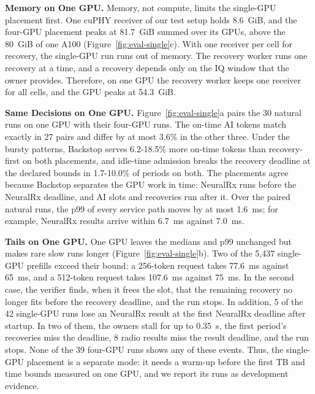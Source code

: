 \documentclass[acmsmall,screen,review,anonymous]{acmart}
\newcommand{\sys}{Backstop\xspace}
\newcommand{\NRx}{NeuralRx\xspace}
\begin{document}
\noindent\textbf{Memory on One GPU.}
Memory, not compute, limits the single-GPU placement first. One cuPHY receiver of our test setup holds
8.6~GiB, and the four-GPU placement peaks at 81.7~GiB summed over its GPUs, above the 80~GiB of one A100
(Figure~\ref{fig:eval-single}c). With one receiver per cell for recovery, the single-GPU run runs out of
memory. The recovery worker runs one recovery at a time, and a recovery depends only on the IQ window that
the owner provides. Therefore, on one GPU the recovery worker keeps one receiver for all cells, and the GPU
peaks at 54.3~GiB.

\noindent\textbf{Same Decisions on One GPU.}
Figure~\ref{fig:eval-single}a pairs the 30 natural runs on one GPU with their four-GPU runs. The on-time AI
tokens match exactly in 27 pairs and differ by at most 3.6\% in the other three. Under the bursty
patterns, \sys serves 6.2-18.5\% more on-time tokens than recovery-first on both placements, and
idle-time admission breaks the recovery deadline at the declared bounds in 1.7-10.0\% of periods on both.
The placements agree because \sys separates the GPU work in time: \NRx runs before the \NRx deadline, and
AI slots and recoveries run after it. Over the paired natural runs, the p99 of every service path moves
by at most 1.6~ms; for example, \NRx results arrive within 6.7~ms against 7.0~ms.

\noindent\textbf{Tails on One GPU.}
One GPU leaves the medians and p99 unchanged but makes rare slow runs longer
(Figure~\ref{fig:eval-single}b). Two of the 5,437 single-GPU prefills exceed their bound: a 256-token
request takes 77.6~ms against 65~ms, and a 512-token request takes 107.6~ms against 75~ms. In the second
case, the verifier finds, when it frees the slot, that the remaining recovery no longer fits before the
recovery deadline, and the run stops. In addition, 5 of the 42 single-GPU runs lose an \NRx result at the
first \NRx deadline after startup. In two of them, the owners stall for up to 0.35~s, the first period's
recoveries miss the deadline, 8 radio results miss the result deadline, and the run stops. None of the 39
four-GPU runs shows any of these events. Thus, the single-GPU placement is a separate mode: it needs a
warm-up before the first TB and time bounds measured on one GPU, and we report its runs as development
evidence.
\end{document}

